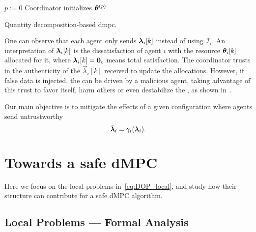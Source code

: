 \documentclass{ifacconf}  %
\begin{document}
\begin{algorithm2e}[h]
  \DontPrintSemicolon%
  $p:=0$\;
  Coordinator initializes $\boldsymbol{\theta}^{(p)}$ \;
 \caption{Quantity decomposition-based \acrshort{dmpc}.}\label{alg:quantityAlg}
\end{algorithm2e}

One can observe that each agent only sends $\lambdaik$ instead of using $\mathcal{I}_{i}$.
An interpretation of $\lambdaik$ is the dissatisfaction of agent $i$ with the resource $\thetaik$ allocated for it, where ${\lambdaik=\0_{c}}$ means total satisfaction.
The coordinator trusts in the authenticity of the $\vec{\lambda}_{i}[k]$ received to update the allocations. However, if false data is injected, the \negotiation{} can be driven by a malicious agent, taking advantage of this trust to favor itself, harm others or even destabilize the \negotiation{}, as shown in~\cite{NogueiraEtAl2021}.


Our main objective is to mitigate the effects of a given configuration where agents send untrustworthy
\begin{equation*}
\tilde{\boldsymbol{\lambda}}_i=\gamma_{i}(\boldsymbol{\lambda}_i).
\end{equation*}

\section{Towards a safe dMPC}\label{sec:TSM}

Here we focus on the local problems in~\eqref{eq:DOP_local}, and study how their structure can contribute for a safe dMPC algorithm.

\subsection{Local Problems --- Formal Analysis}\label{ssec:FA}
\end{document}
